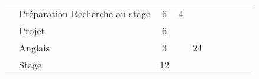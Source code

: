 \begin{tabular}{c|m{6cm}|cm{1cm}|cm{1cm}|cm{1cm}|cm{1cm}|}
 & \color{black} \mbox{Préparation} \mbox{Recherche} \mbox{au} \mbox{stage}  & \color{black} 6 & \color{black} 4 & \color{black}  & \color{black}  \\ \cline{2-6}
 & \cellcolor{couleurClaire} \color{couleurTexte} \mbox{Projet}  & \cellcolor{couleurClaire} \color{couleurTexte} 6 & \cellcolor{couleurClaire} \color{couleurTexte}  & \cellcolor{couleurClaire} \color{couleurTexte}  & \cellcolor{couleurClaire} \color{couleurTexte}  \\ \cline{2-6}
 & \color{black} \mbox{Anglais}  & \color{black} 3 & \color{black}  & \color{black} 24 & \color{black}  \\ \cline{2-6}
 & \cellcolor{couleurClaire} \color{couleurTexte} \mbox{Stage}  & \cellcolor{couleurClaire} \color{couleurTexte} 12 & \cellcolor{couleurClaire} \color{couleurTexte}  & \cellcolor{couleurClaire} \color{couleurTexte}  & \cellcolor{couleurClaire} \color{couleurTexte}  \\ \cline{2-6}
\hline
\end{tabular}
